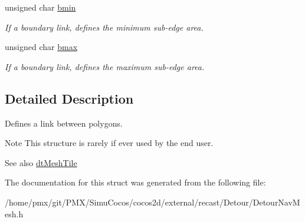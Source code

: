 \begin{DoxyCompactItemize}
\mbox{\label{structdtLink_a0123fe6375fa414a48b2e73c3b23a1ce}} 
unsigned char \hyperlink{structdtLink_a0123fe6375fa414a48b2e73c3b23a1ce}{bmin}
\begin{DoxyCompactList}\small\item\em If a boundary link, defines the minimum sub-\/edge area. \end{DoxyCompactList}\item 
\mbox{\label{structdtLink_ac8a3afc341614707afb915d2822ffdc7}} 
unsigned char \hyperlink{structdtLink_ac8a3afc341614707afb915d2822ffdc7}{bmax}
\begin{DoxyCompactList}\small\item\em If a boundary link, defines the maximum sub-\/edge area. \end{DoxyCompactList}\end{DoxyCompactItemize}


\subsection{Detailed Description}
Defines a link between polygons. \begin{DoxyNote}{Note}
This structure is rarely if ever used by the end user. 
\end{DoxyNote}
\begin{DoxySeeAlso}{See also}
\hyperlink{structdtMeshTile}{dt\+Mesh\+Tile} 
\end{DoxySeeAlso}


The documentation for this struct was generated from the following file\+:\begin{DoxyCompactItemize}
\item 
/home/pmx/git/\+P\+M\+X/\+Simu\+Cocos/cocos2d/external/recast/\+Detour/Detour\+Nav\+Mesh.\+h\end{DoxyCompactItemize}
